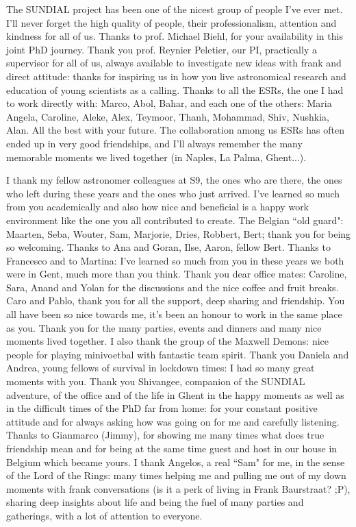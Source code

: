 The SUNDIAL project has been one of the nicest group of people I've ever met. I'll never forget the high quality of people, their professionalism, attention and kindness for all of us. Thanks to prof. Michael Biehl, for your availability in this joint PhD journey.
Thank you prof. Reynier Peletier, our PI, practically a supervisor for all of us, always available to investigate new ideas with frank and direct attitude: %
thanks for inspiring us in how you live astronomical research and education of young scientists as a calling.
Thanks to all the ESRs, the one I had to work directly with: Marco, Abol, Bahar, and each one of the others: Maria Angela, Caroline, Aleke, Alex, Teymoor, Thanh, Mohammad, Shiv, Nushkia, Alan. All the best with your future.
The collaboration among us ESRs has often ended up in very good friendships, and I'll always remember the many memorable moments we lived together (in Naples, La Palma, Ghent...).

I thank my fellow astronomer colleagues at S9, the ones who are there, the ones who left during these years and the ones who just arrived. I've learned so much from you academically and also how nice and beneficial is a happy work environment like the one you all contributed to create.
The Belgian ``old guard": Maarten, Seba, Wouter, Sam, Marjorie, Dries, Robbert, Bert; thank you for being so welcoming.
Thanks to Ana and Goran, Ilse, Aaron, fellow Bert. Thanks to Francesco and to Martina: I've learned so much from you in these years we both were in Gent, much more than you think.
Thank you dear office mates: Caroline, Sara, Anand and Yolan for the discussions and the nice coffee and fruit breaks.
Caro and Pablo, thank you for all the support, deep sharing and friendship.
You all have been so nice towards me, it's been an honour to work in the same place as you. Thank you for the many parties, events and dinners and many nice moments lived together.
I also thank the group of the Maxwell Demons: nice people for playing minivoetbal with fantastic team spirit.
Thank you Daniela and Andrea, young fellows of survival in lockdown times: I had so many great moments with you.
Thank you Shivangee, companion of the SUNDIAL adventure, of the office and of the life in Ghent in the happy moments as well as in the difficult times of the PhD far from home: for your constant positive attitude and for always asking how was going on for me and carefully listening.
Thanks to Gianmarco (Jimmy), for showing me many times what does true friendship mean and for being at the same time guest and host in our house in Belgium which became yours.
I thank Angelos, a real ``Sam" for me, in the sense of the Lord of the Rings: many times helping me %
and pulling me out of my down moments with frank conversations (is it a perk of living in Frank Baurstraat? ;P), sharing deep insights about life and being the fuel of many parties and gatherings, with a lot of attention to everyone.

